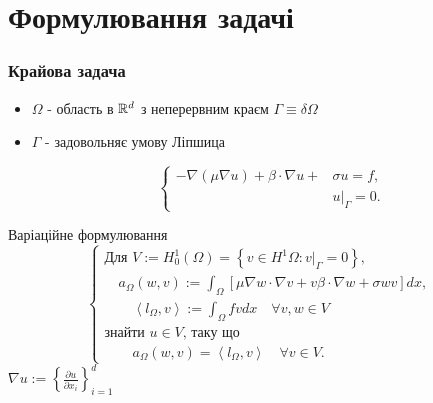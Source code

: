 
\newcommand{\vonenorm}{\left|v\right|_{1,\Omega}}
\newcommand{\infnorm}[1]{\norm{#1}_\infty}

\section{Формулювання задачі}
\frame{\sectionpage}
\begin{frame}
	\frametitle<presentation>{Крайова задача}

		 \begin{itemize}
		 	\item $\Omega$ - область в $\mathbb{R}^d$ з неперервним краєм $\Gamma \equiv \delta \Omega$
		 	\item $\Gamma$ - задовольняє умову Ліпшица

				 \begin{equation}\label{eq:general_boundary}
					\begin{cases}
							- \nabla (\mu \nabla u) + \beta \cdot \nabla u + &\sigma u = f,  \\
							&u|_\Gamma = 0.
					\end{cases}
				\end{equation}
		\end{itemize}
\end{frame}

\begin{frame}{Варіаційне формулювання}
		\begin{equation}\label{eq:general_variational}
			\begin{cases}
				\mbox{Для } V := H_0^1 \left( \Omega \right) =
				\left\lbrace
					v \in H^1 \Omega : v|_\Gamma = 0
				\right\rbrace, \\

				\quad a_\Omega(w,v) := \displaystyle\int_\Omega
				\left[
					\mu \nabla w \cdot \nabla v +v \beta \cdot \nabla w + \sigma wv
				\right] dx, \\

				\qquad \left\langle l_\Omega, v \right\rangle := \displaystyle\int_\Omega fvdx \quad \forall v,w \in V \\

				\mbox{знайти }u \in V \mbox{, таку що} \\

				\qquad a_\Omega(w,v) = \left\langle l_\Omega, v \right\rangle \quad \forall v \in V.
			\end{cases}
		\end{equation}
		$\nabla u := \left\lbrace \frac{\partial u}{\partial x_i} \right\rbrace_{i=1}^d$

\end{frame}

